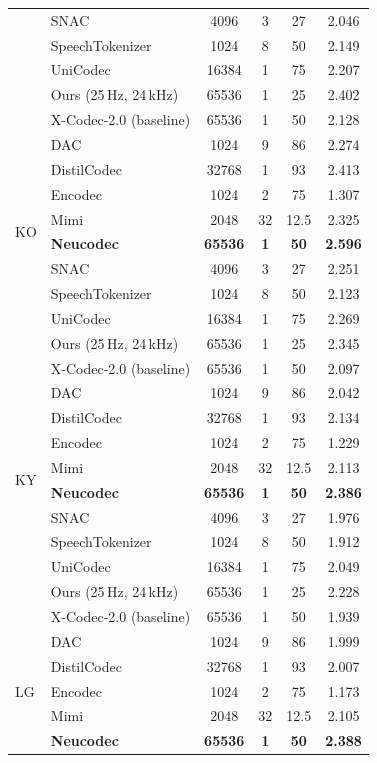 \documentclass[preprint]{article}
\begin{document}
\begin{longtable}{llcccc}
  & SNAC & 4096 & 3 & 27 & 2.046 \\
  & SpeechTokenizer & 1024 & 8 & 50 & 2.149 \\
  & UniCodec & 16384 & 1 & 75 & 2.207 \\
  & Ours (25\,Hz, 24\,kHz) & 65536 & 1 & 25 & 2.402 \\
  & X-Codec-2.0 (baseline) & 65536 & 1 & 50 & 2.128 \\
\midrule
\multirow{8}{*}{KO}
  & DAC & 1024 & 9 & 86 & 2.274 \\
  & DistilCodec & 32768 & 1 & 93 & 2.413 \\
  & Encodec & 1024 & 2 & 75 & 1.307 \\
  & Mimi & 2048 & 32 & 12.5 & 2.325 \\
  & \textbf{Neucodec} & \textbf{65536} & \textbf{1} & \textbf{50} & \textbf{2.596} \\
  & SNAC & 4096 & 3 & 27 & 2.251 \\
  & SpeechTokenizer & 1024 & 8 & 50 & 2.123 \\
  & UniCodec & 16384 & 1 & 75 & 2.269 \\
  & Ours (25\,Hz, 24\,kHz) & 65536 & 1 & 25 & 2.345 \\
  & X-Codec-2.0 (baseline) & 65536 & 1 & 50 & 2.097 \\
\midrule
\multirow{8}{*}{KY}
  & DAC & 1024 & 9 & 86 & 2.042 \\
  & DistilCodec & 32768 & 1 & 93 & 2.134 \\
  & Encodec & 1024 & 2 & 75 & 1.229 \\
  & Mimi & 2048 & 32 & 12.5 & 2.113 \\
  & \textbf{Neucodec} & \textbf{65536} & \textbf{1} & \textbf{50} & \textbf{2.386} \\
  & SNAC & 4096 & 3 & 27 & 1.976 \\
  & SpeechTokenizer & 1024 & 8 & 50 & 1.912 \\
  & UniCodec & 16384 & 1 & 75 & 2.049 \\
  & Ours (25\,Hz, 24\,kHz) & 65536 & 1 & 25 & 2.228 \\
  & X-Codec-2.0 (baseline) & 65536 & 1 & 50 & 1.939 \\
\midrule
\multirow{8}{*}{LG}
  & DAC & 1024 & 9 & 86 & 1.999 \\
  & DistilCodec & 32768 & 1 & 93 & 2.007 \\
  & Encodec & 1024 & 2 & 75 & 1.173 \\
  & Mimi & 2048 & 32 & 12.5 & 2.105 \\
  & \textbf{Neucodec} & \textbf{65536} & \textbf{1} & \textbf{50} & \textbf{2.388} \\

\end{longtable}
\end{document}
